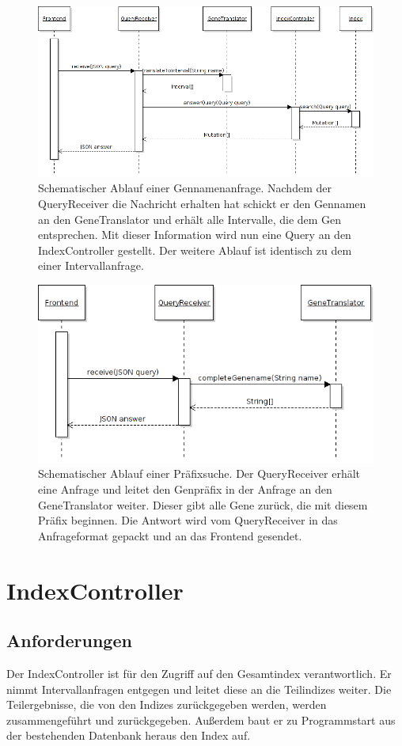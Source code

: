 \documentclass[]{article}
\begin{document}
\begin{figure}[H]
\includegraphics[width=1\textwidth]{namesearch_seq.png}
\caption{Schematischer Ablauf einer Gennamenanfrage. Nachdem der QueryReceiver die Nachricht erhalten hat schickt er den Gennamen an den GeneTranslator und erhält alle Intervalle, die dem Gen entsprechen. Mit dieser Information wird nun eine Query an den IndexController gestellt. Der weitere Ablauf ist identisch zu dem einer Intervallanfrage.}
\end{figure}
\begin{figure}[H]
\includegraphics[width=1\textwidth]{prefix_seq.png}
\caption{Schematischer Ablauf einer Präfixsuche. Der QueryReceiver erhält eine Anfrage und leitet den Genpräfix in der Anfrage an den GeneTranslator weiter. Dieser gibt alle Gene zurück, die mit diesem Präfix beginnen. Die Antwort wird vom QueryReceiver in das Anfrageformat gepackt und an das Frontend gesendet.}
\end{figure}
\newpage
\section{IndexController}
\subsection{Anforderungen}
Der IndexController ist für den Zugriff auf den Gesamtindex verantwortlich. Er nimmt Intervallanfragen entgegen und leitet diese an die Teilindizes weiter.
Die Teilergebnisse, die von den Indizes zurückgegeben werden, werden zusammengeführt und zurückgegeben.
Außerdem baut er zu Programmstart aus der bestehenden Datenbank heraus den Index auf.
\end{document}

